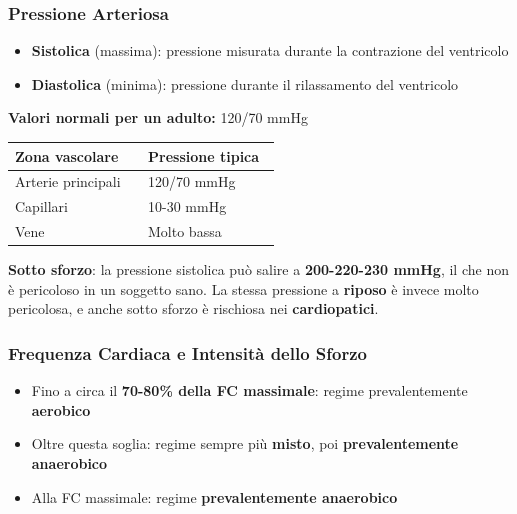\documentclass[a4paper,11pt]{article}
\providecommand{\tightlist}{%
  \setlength{\itemsep}{0pt}\setlength{\parskip}{0pt}}
\begin{document}
\subsubsection{Pressione Arteriosa}\label{pressione-arteriosa}

\begin{itemize}
      \tightlist
      \item
            \textbf{Sistolica} (massima): pressione misurata durante la
            contrazione del ventricolo
      \item
            \textbf{Diastolica} (minima): pressione durante il rilassamento del
            ventricolo
\end{itemize}

\textbf{Valori normali per un adulto:} 120/70 mmHg

\begin{longtable}[]{@{}p{0.47\linewidth}p{0.47\linewidth}@{}}
      \toprule\noalign{}
      Zona vascolare     & Pressione tipica \\
      \midrule\noalign{}
      \endhead
      \bottomrule\noalign{}
      \endlastfoot
      Arterie principali & 120/70 mmHg      \\
      Capillari          & 10-30 mmHg       \\
      Vene               & Molto bassa      \\
\end{longtable}

\textbf{Sotto sforzo}: la pressione sistolica può salire a
\textbf{200-220-230 mmHg}, il che non è pericoloso in un soggetto sano.
La stessa pressione a \textbf{riposo} è invece molto pericolosa, e anche
sotto sforzo è rischiosa nei \textbf{cardiopatici}.

\subsubsection{Frequenza Cardiaca e Intensità dello
      Sforzo}\label{frequenza-cardiaca-e-intensituxe0-dello-sforzo}

\begin{itemize}
      \tightlist
      \item
            Fino a circa il \textbf{70-80\% della FC massimale}: regime
            prevalentemente \textbf{aerobico}
      \item
            Oltre questa soglia: regime sempre più \textbf{misto}, poi
            \textbf{prevalentemente anaerobico}
      \item
            Alla FC massimale: regime \textbf{prevalentemente anaerobico}
\end{itemize}
\end{document}
